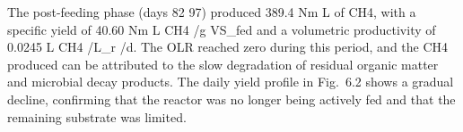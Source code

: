 \documentclass[12pt, a4paper, oneside]{report}
\begin{document}
The post-feeding phase (days 82 97) produced 389.4 Nm L of CH4, with a specific yield of 40.60 Nm L CH4 /g VS_fed and a volumetric productivity of 0.0245 L CH4 /L_r /d. The OLR reached zero during this period, and the CH4 produced can be attributed to the slow degradation of residual organic matter and microbial decay products. The daily yield profile in Fig. 6.2 shows a gradual decline, confirming that the reactor was no longer being actively fed and that the remaining substrate was limited.

\begingroup


\end{document}
